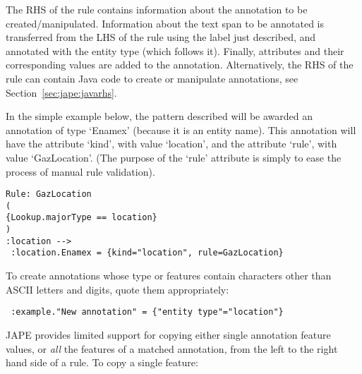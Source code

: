 
The RHS of the rule contains information about the annotation to be
created/manipulated. Information about the text span to be annotated is
transferred from the LHS of the rule using the label just described, and
annotated with the entity type (which follows it). Finally, attributes and their
corresponding values are added to the annotation. Alternatively, the RHS of the
rule can contain Java code to create or manipulate annotations, see
Section~\ref{sec:jape:javarhs}.


In the simple example below, the pattern described will be
awarded an annotation of type `Enamex' (because it is an entity
name). This annotation will have the attribute `kind', with value
`location', and the attribute `rule', with value `GazLocation'. (The
purpose of the `rule' attribute is simply to ease the process of manual
rule validation).

\begin{small}
\begin{verbatim}
Rule: GazLocation
(
{Lookup.majorType == location}
)
:location -->
 :location.Enamex = {kind="location", rule=GazLocation}
\end{verbatim}
\end{small}

To create annotations whose type or features contain characters other
than ASCII letters and digits, quote them appropriately:

\begin{small}
\begin{verbatim}
 :example."New annotation" = {"entity type"="location"}
\end{verbatim}
\end{small}


JAPE provides limited support for copying either single annotation feature
values, or \emph{all} the features of a matched annotation, from the left to
the right hand side of a rule.  To copy a single feature:

